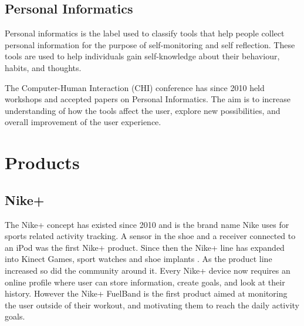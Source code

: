  
\subsection{Personal Informatics}
Personal informatics is the label used to classify tools that help people collect personal information for the purpose of self-monitoring and self reflection. These tools are used to help individuals gain self-knowledge about their behaviour, habits, and thoughts\cite{personalInformatics}.

The Computer-Human Interaction (CHI) conference has since 2010 \cite{chi2010} held workshops and accepted papers on Personal Informatics. The aim is to increase understanding of how the tools affect the user, explore new possibilities, and overall improvement of the user experience.
	
\section{Products}
\subsection{Nike+}
The Nike+ concept has existed since 2010 and is the brand name Nike uses for sports related activity tracking. A sensor in the shoe and a receiver connected to an iPod was the first Nike+ product. Since then the Nike+ line has expanded into Kinect Games, sport watches and shoe implants \cite{nikeProducts}. As the product line increased so did the community around it. Every Nike+ device now requires an online profile where user can store information, create goals, and look at their history. However the Nike+ FuelBand \cite{fuelBand} is the first product aimed at monitoring the user outside of their workout, and motivating them to reach the daily activity goals.

